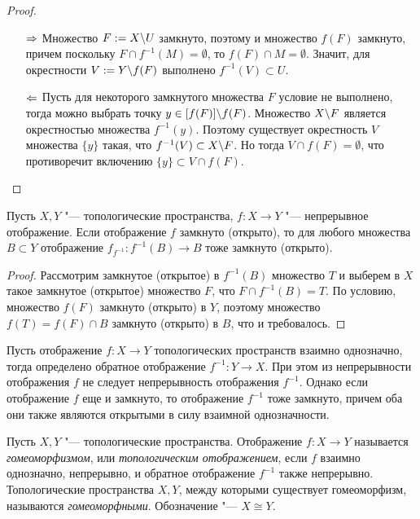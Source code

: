 \begin{proof}~
	\begin{itemize}
		\item[$\Rightarrow$] Множество $F := X \backslash U$ замкнуто, поэтому и множество $f(F)$ замкнуто, причем поскольку $F \cap f^{-1}(M) = \emptyset$, то $f(F) \cap M = \emptyset$. Значит, для окрестности $V := Y \backslash f(F)$ выполнено $f^{-1}(V) \subset U$.
		
		\item[$\Leftarrow$] Пусть для некоторого замкнутого множества $F$ условие не выполнено, тогда можно выбрать точку $y \in [f(F)] \backslash f(F)$. Множество $X \backslash F$ является окрестностью множества $f^{-1}(y)$. Поэтому существует окрестность $V$ множества $\{y\}$ такая, что $f^{-1}(V) \subset X \backslash F$. Но тогда $V \cap f(F) = \emptyset$, что противоречит включению $\{y\} \subset V \cap f(F)$.\qedhere
	\end{itemize}
\end{proof}

\begin{proposition}
	Пусть $X, Y$ "--- топологические пространства, $f: X \to Y$ "--- непрерывное отображение. Если отображение $f$ замкнуто (открыто), то для любого множества $B \subset Y$ отображение $f_{f^{-1}}: f^{-1}(B) \rightarrow B$ тоже замкнуто (открыто).
\end{proposition}

\begin{proof}
	Рассмотрим замкнутое (открытое) в $f^{-1}(B)$ множество $T$ и выберем в $X$ такое замкнутое (открытое) множество $F$, что $F \cap f^{-1}(B) = T$. По условию, множество $f(F)$ замкнуто (открыто) в $Y$, поэтому множество $f(T) = f(F) \cap B$ замкнуто (открыто) в $B$, что и требовалось.
\end{proof}

\begin{note}
	Пусть отображение $f: X \rightarrow Y$ топологических пространств взаимно однозначно, тогда определено обратное отображение $f^{-1}: Y \to X$. При этом из непрерывности отображения $f$ не следует непрерывность отображения $f^{-1}$. Однако если отображение $f$ еще и замкнуто, то отображение $f^{-1}$ тоже замкнуто, причем оба они также являются открытыми в силу взаимной однозначности.
\end{note}

\begin{definition}
	Пусть $X, Y$ "--- топологические пространства. Отображение $f: X \rightarrow Y$ называется \textit{гомеоморфизмом}, или \textit{топологическим отображением}, если $f$ взаимно однозначно, непрерывно, и обратное отображение $f^{-1}$ также непрерывно. Топологические пространства $X, Y$, между которыми существует гомеоморфизм, называются \textit{гомеоморфными}. Обозначение "--- $X \cong Y$.
\end{definition}

